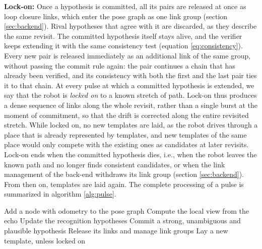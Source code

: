 \textbf{Lock-on:} Once a hypothesis is committed, all its pairs are released at once as loop closure links, which enter the pose graph as one link group (section \ref{sec:backend}). Rival hypotheses that agree with it are discarded, as they describe the same revisit. The committed hypothesis itself stays alive, and the verifier keeps extending it with the same consistency test (equation \ref{eq:consistency}). Every new pair is released immediately as an additional link of the same group, without passing the commit rule again: the pair continues a chain that has already been verified, and its consistency with both the first and the last pair ties it to that chain. At every pulse at which a committed hypothesis is extended, we say that the robot is \emph{locked on} to a known stretch of path. Lock-on thus produces a dense sequence of links along the whole revisit, rather than a single burst at the moment of commitment, so that the drift is corrected along the entire revisited stretch. While locked on, no new templates are laid, as the robot drives through a place that is already represented by templates, and new templates of the same place would only compete with the existing ones as candidates at later revisits. Lock-on ends when the committed hypothesis dies, i.e., when the robot leaves the known path and no longer finds consistent candidates, or when the link management of the back-end withdraws its link group (section \ref{sec:backend}). From then on, templates are laid again. The complete processing of a pulse is summarized in algorithm \ref{alg:pulse}.

\begin{algorithm}[t]
\caption{Processing of one pulse in BatSLAM 2.0.}
\label{alg:pulse}
\small
\begin{algorithmic}[1]
\State Add a node with odometry to the pose graph
\State Compute the local view from the echo 
\State Update the recognition hypotheses 
\State Commit a strong, unambiguous and plausible hypothesis
\State Release its links and manage link groups 
\State Lay a new template, unless locked on
\end{algorithmic}
\end{algorithm}
